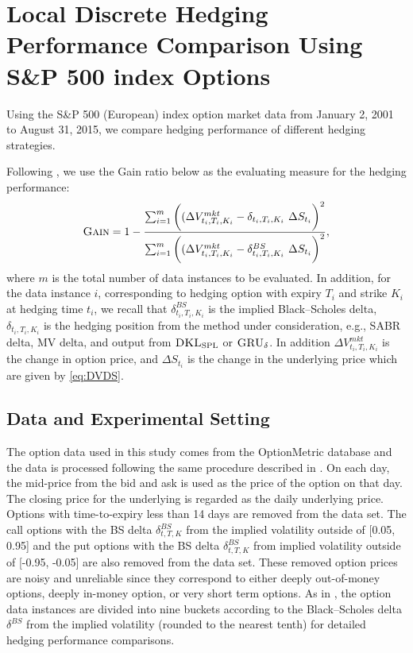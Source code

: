 \documentclass[letterpaper,12pt,titlepage,oneside,final]{book}
\numberwithin{equation}{section}
\theoremstyle{definition}
\newcommand{\model}{\textsc{GRU}_\delta}
\newcommand{\DKLs}{\bf\textsc{DKL}_{\text{SPL}}}
\begin{document}
\chapter{Local Discrete Hedging Performance Comparison Using  S\&P 500 index Options}
\label{sec:LocalComparison}
Using the S\&P 500  ({European})  index option market data from January 2, 2001 to August 31, 2015,
we  compare hedging performance of different hedging strategies.

Following \cite{hulloptimal},  we use the Gain ratio below as the evaluating measure for the hedging performance:
\[
\textsc{Gain}=1-\frac{\sum_{i=1}^m \bigg((\Delta V^{mkt}_{t_i,T_i,K_i}-\delta_{t_i,T_i,K_i} ~ \Delta S_{t_i} \bigg)^2}{\sum_{i=1}^m \bigg((\Delta V^{mkt}_{t_i,T_i,K_i}-\delta^{BS}_{t_i,T_i,K_i} ~ \Delta S_{t_i} \bigg)^2},
\]
where $m$ is the total number of data instances to be evaluated. In addition,  for the data instance $i$, corresponding to hedging option with expiry $T_i$ and strike $K_i$ at hedging time $t_i$, we recall that $\delta^{BS}_{t_i,T_i,K_i}$ is the implied Black–Scholes delta, $\delta_{t_i,T_i,K_i}$  is the hedging position from the method under consideration,  e.g., SABR delta,  MV delta,  and output from $\DKLs$ or $\model$.
  In addition $\Delta V^{mkt}_{t_i,T_i,K_i}$ is the change in option price, and $\Delta S_{t_i}$ is  the change in the underlying price which are given by \eqref{eq:DVDS}.




\section{Data and Experimental Setting}
The option data used in this study comes from the OptionMetric database  and the data is processed following the same procedure described in \cite{hulloptimal}.
On each day, the mid-price from the bid and ask is used as the price of the option on that day. The closing price for the underlying is regarded as the daily underlying price.
Options with time-to-expiry less than 14 days are removed from the data set.  The call options  with the  BS delta $\delta^{BS}_{t,T,K}$ from the implied volatility outside of  [0.05, 0.95]  and the put options with the  BS delta $\delta^{BS}_{t,T,K}$ from implied volatility outside of [-0.95, -0.05] are also removed from the data set. These removed option prices are noisy and unreliable since they correspond to either deeply out-of-money options, deeply in-money option, or very short term options.
As in \cite{hulloptimal},  the option data instances are divided into nine buckets according to the Black–Scholes delta $\delta^{BS}$ from the implied volatility (rounded to the nearest tenth) for  detailed hedging performance comparisons.
\end{document}

